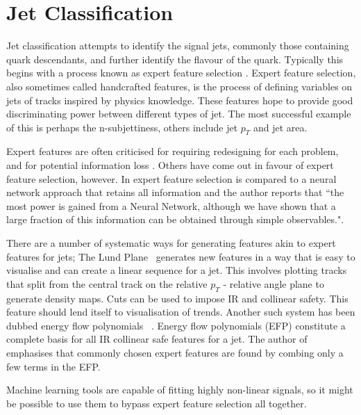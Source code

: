 \FloatBarrier
\section{Jet Classification}\label{sec:jetclasification}
Jet classification attempts to identify the signal jets,
commonly those containing quark descendants,
and further identify the flavour of the quark.
Typically this begins with a process known as expert feature selection \cite{CMS_CSVDeepCSV13TeV, Schramm:2291608}.
Expert feature selection, also sometimes called handcrafted features, is the process of defining variables on jets of tracks inspired by physics knowledge.
These features hope to provide good discriminating power between different types of jet.
The most successful example of this is perhaps the n-subjettiness, others include jet \(p_T\) and jet area.

Expert features are often criticised for requiring redesigning for each problem, and for potential information loss \cite{cheng_recursive_2018, radovic_machine_2018}.
Others have come out in favour of expert feature selection, however. In \cite{Lin_boostingbbH2018} expert feature selection is compared to a neural network approach that retains all information and the author reports that ``the most power is gained from a Neural Network, although we have shown that a large fraction of this information can be obtained through simple observables.".

There are a number of systematic ways for generating features akin to expert features for jets;
The Lund Plane~\cite{Dreyer_LundPlane2018} generates new features in a way that is easy to visualise and can create a linear sequence for a jet.
This involves plotting tracks that split from the central track on the relative \(p_T\) - relative angle plane to generate density maps.
Cuts can be used to impose IR and collinear safety.
This feature should lend itself to visualisation of trends.
Another such system has been dubbed energy flow polynomials~ \cite{Komiske_flowPolynomials2018}.
Energy flow polynomials (EFP) constitute a complete basis for all IR collinear safe features for a jet.
The author of \cite{Komiske_flowPolynomials2018} emphasises that commonly chosen expert features are found by combing only a few terms in the EFP.

Machine learning tools are capable of fitting highly non-linear signals,
so it might be possible to use them to bypass expert feature selection all together.

